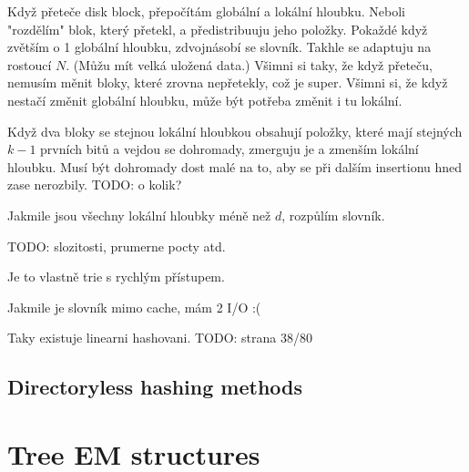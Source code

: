 \documentclass[a4paper]{article}
\begin{document}
Když přeteče disk block, přepočítám globální a lokální hloubku.
Neboli "rozdělím" blok, který přetekl, a předistribuuju jeho položky.
Pokaždé když zvětším o 1 globální hloubku, zdvojnásobí se slovník. Takhle se
adaptuju na rostoucí $N$. (Můžu mít velká uložená data.)
Všimni si taky, že když přeteču, nemusím měnit bloky, které zrovna nepřetekly,
což je super.
Všimni si, že když nestačí změnit globální hloubku, může být potřeba změnit i tu
lokální.

Když dva bloky se stejnou lokální hloubkou obsahují položky, které mají stejných
$k-1$ prvních bitů a vejdou se dohromady, zmerguju je a zmenším lokální hloubku.
Musí být dohromady dost malé na to, aby se při dalším insertionu hned zase
nerozbily. TODO: o kolik?

Jakmile jsou všechny lokální hloubky méně než $d$, rozpůlím slovník.

TODO: slozitosti, prumerne pocty atd.

Je to vlastně trie s rychlým přístupem.

Jakmile je slovník mimo cache, mám 2 I/O :(

Taky existuje linearni hashovani. TODO: strana 38/80

\subsection{Directoryless hashing methods}

\section{Tree EM structures}
\end{document}
